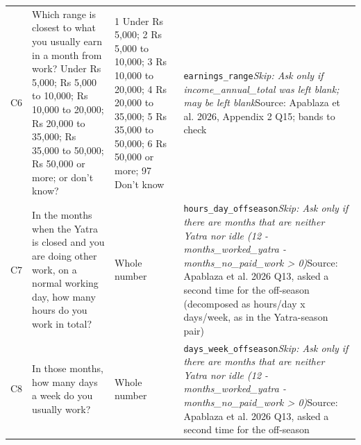 \documentclass[10pt]{article}
\begin{document}
{\begin{longtable}{p{0.8cm}p{6.4cm}p{3.6cm}p{5.8cm}}
C6 & Which range is closest to what you usually earn in a month from work? Under Rs 5,000; Rs 5,000 to 10,000; Rs 10,000 to 20,000; Rs 20,000 to 35,000; Rs 35,000 to 50,000; Rs 50,000 or more; or don't know? & 1 Under Rs 5,000; 2 Rs 5,000 to 10,000; 3 Rs 10,000 to 20,000; 4 Rs 20,000 to 35,000; 5 Rs 35,000 to 50,000; 6 Rs 50,000 or more; 97 Don't know & \texttt{earnings\_range}\newline \textit{Skip: Ask only if income\_annual\_total was left blank; may be left blank}\newline Source: Apablaza et al. 2026, Appendix 2 Q15; bands to check \\
C7 & In the months when the Yatra is closed and you are doing other work, on a normal working day, how many hours do you work in total? & Whole number & \texttt{hours\_day\_offseason}\newline \textit{Skip: Ask only if there are months that are neither Yatra nor idle (12 - months\_worked\_yatra - months\_no\_paid\_work > 0)}\newline Source: Apablaza et al. 2026 Q13, asked a second time for the off-season (decomposed as hours/day x days/week, as in the Yatra-season pair) \\
C8 & In those months, how many days a week do you usually work? & Whole number & \texttt{days\_week\_offseason}\newline \textit{Skip: Ask only if there are months that are neither Yatra nor idle (12 - months\_worked\_yatra - months\_no\_paid\_work > 0)}\newline Source: Apablaza et al. 2026 Q13, asked a second time for the off-season \\
\bottomrule
\end{longtable}
}
\end{document}

